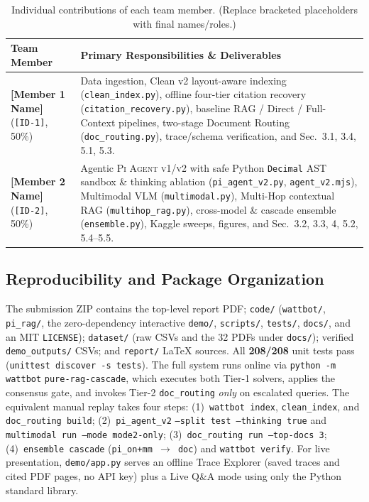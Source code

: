 \documentclass[sigconf,nonacm]{acmart}
\newcommand{\code}[1]{\texttt{\small #1}}
\begin{document}
\begin{table}[t]
  \centering
  \caption{Individual contributions of each team member. (Replace bracketed placeholders with final names/roles.)}
  \label{tab:contrib}
  \footnotesize
  \setlength{\tabcolsep}{4pt}
  \begin{tabular}{@{} >{\raggedright\arraybackslash}p{} p{} @{}}
    \toprule
    \textbf{Team Member} & \textbf{Primary Responsibilities \& Deliverables} \\
    \midrule
    \textbf{[Member 1 Name]} \newline (\code{[ID-1]}, 50\%) &
      Data ingestion, Clean v2 layout-aware indexing (\code{clean\_index.py}), offline four-tier citation recovery (\code{citation\_recovery.py}), baseline RAG / Direct / Full-Context pipelines, two-stage Document Routing (\code{doc\_routing.py}), trace/schema verification, and Sec.~3.1, 3.4, 5.1, 5.3. \\
    \midrule
    \textbf{[Member 2 Name]} \newline (\code{[ID-2]}, 50\%) &
      Agentic \textsc{Pi Agent v1/v2} with safe Python \code{Decimal} AST sandbox \& thinking ablation (\code{pi\_agent\_v2.py}, \code{agent\_v2.mjs}), Multimodal VLM (\code{multimodal.py}), Multi-Hop contextual RAG (\code{multihop\_rag.py}), cross-model \& cascade ensemble (\code{ensemble.py}), Kaggle sweeps, figures, and Sec.~3.2, 3.3, 4, 5.2, 5.4--5.5. \\
    \bottomrule
  \end{tabular}
  \vspace{-0.8em}
\end{table}

\subsection{Reproducibility and Package Organization}
The submission ZIP contains the top-level report PDF; \code{code/} (\code{wattbot/}, \code{pi\_rag/}, the zero-dependency interactive \code{demo/}, \code{scripts/}, \code{tests/}, \code{docs/}, and an MIT \code{LICENSE}); \code{dataset/} (raw CSVs and the 32 PDFs under \code{docs/}); verified \code{demo\_outputs/} CSVs; and \code{report/} \LaTeX{} sources. All \textbf{208/208} unit tests pass (\code{unittest discover -s tests}). The full system runs online via \code{python -m wattbot} \code{pure-rag-cascade}, which executes both Tier-1 solvers, applies the consensus gate, and invokes Tier-2 \code{doc\_routing} \emph{only} on escalated queries. The equivalent manual replay takes four steps:
(1)~\code{wattbot index}, \code{clean\_index}, and \code{doc\_routing build};
(2)~\code{pi\_agent\_v2} \code{--split test --thinking true} and \code{multimodal run --mode mode2-only};
(3)~\code{doc\_routing run --top-docs 3};
(4)~\code{ensemble cascade} (\code{pi\_on+mm $\to$ doc}) and \code{wattbot verify}.
For live presentation, \code{demo/app.py} serves an offline Trace Explorer (saved traces and cited PDF pages, no API key) plus a Live Q\&A mode using only the Python standard library.
\end{document}
